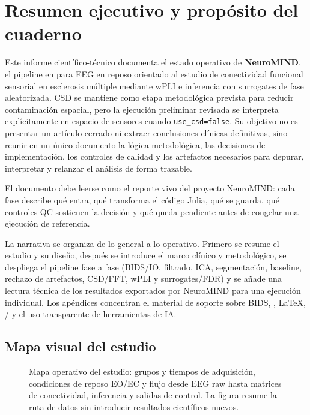 \section{Resumen ejecutivo y propósito del cuaderno}

Este informe científico-técnico documenta el estado operativo de \textbf{NeuroMIND}, el pipeline en \Julia{} para EEG en reposo orientado al estudio de conectividad funcional sensorial en esclerosis múltiple mediante wPLI e inferencia con surrogates de fase aleatorizada. CSD se mantiene como etapa metodológica prevista para reducir contaminación espacial, pero la ejecución preliminar revisada se interpreta explícitamente en espacio de sensores cuando \texttt{use\_csd=false}. Su objetivo no es presentar un artículo cerrado ni extraer conclusiones clínicas definitivas, sino reunir en un único documento la lógica metodológica, las decisiones de implementación, los controles de calidad y los artefactos necesarios para depurar, interpretar y relanzar el análisis de forma trazable.

\begin{ideaclave}
El documento debe leerse como el reporte vivo del proyecto NeuroMIND: cada fase describe qué entra, qué transforma el código Julia, qué se guarda, qué controles QC sostienen la decisión y qué queda pendiente antes de congelar una ejecución de referencia.
\end{ideaclave}

La narrativa se organiza de lo general a lo operativo. Primero se resume el estudio y su diseño, después se introduce el marco clínico y metodológico, se despliega el pipeline fase a fase (BIDS/IO, filtrado, ICA, segmentación, baseline, rechazo de artefactos, CSD/FFT, wPLI y surrogates/FDR) y se añade una lectura técnica de los resultados exportados por NeuroMIND para una ejecución individual. Los apéndices concentran el material de soporte sobre BIDS, \Julia{}, \LaTeX{}, \Git{}/\GitHub{} y el uso transparente de herramientas de IA.

\subsection{Mapa visual del estudio}

\begin{fullwidth}
\begin{figure}[H]
\centering
\resizebox{0.98\fulltextwidth}{!}{\NSStudyMap}
\caption{Mapa operativo del estudio: grupos y tiempos de adquisición, condiciones de reposo EO/EC y flujo desde EEG raw hasta matrices de conectividad, inferencia y salidas de control. La figura resume la ruta de datos sin introducir resultados científicos nuevos.}
\label{fig:generated-study-map}
\end{figure}
\end{fullwidth}

